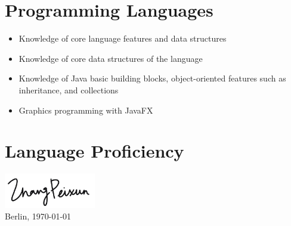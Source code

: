 \documentclass[10pt,a4paper,sans]{moderncv}
\begin{document}
\section{Programming Languages}
 {
  \begin{itemize}
    \item Knowledge of core language features and data structures
  \end{itemize}
}
 {
  \begin{itemize}
      \item Knowledge of core data structures of the language
  \end{itemize}
}
 {
  \begin{itemize}
    \item Knowledge of Java basic building blocks, object-oriented features such as inheritance, and collections
    \item Graphics programming with JavaFX
  \end{itemize}
}

\section{Language Proficiency}

\emptysection{}\closesection
\vfill
\vspace{-0.85cm}
\begin{flushright}
  \includegraphics[width=0.3\textwidth]{signature}
  ~\\
  Berlin, \today
\end{flushright}
\end{document}
